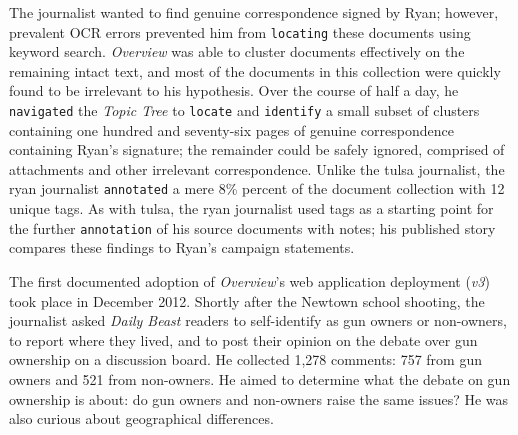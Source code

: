 The journalist wanted to find genuine correspondence signed by Ryan; however, prevalent \ac{OCR} errors prevented him from {\tt locating} these documents using keyword search. 
{\it Overview} was able to cluster documents effectively on the remaining intact text, and most of the documents in this collection were quickly found to be irrelevant to his hypothesis.
Over the course of half a day, he {\tt navigated} the {\it Topic Tree} to {\tt locate} and {\tt identify} a small subset of clusters containing one hundred and seventy-six pages of genuine correspondence containing Ryan's signature; the remainder could be safely ignored, comprised of attachments and other irrelevant correspondence.
Unlike the {\sc tulsa} journalist, the {\sc ryan} journalist {\tt annotated} a mere 8\% percent of the document collection with 12 unique tags.
As with {\sc tulsa}, the {\sc ryan} journalist used tags as a starting point for the further {\tt annotation} of his source documents with notes; his published story~\cite{Gillum2012} compares these findings to Ryan's campaign statements.

The first documented adoption of {\it Overview}'s web application deployment ({\it v3}) took place in December 2012.
Shortly after the Newtown school shooting, the journalist asked {\it Daily Beast} readers to self-identify as gun owners or non-owners, to report where they lived, and to post their opinion on the debate over gun ownership on a discussion board. 
He collected 1,278 comments: 757 from gun owners and 521 from non-owners.
He aimed to determine what the debate on gun ownership is about: do gun owners and non-owners raise the same issues? 
He was also curious about geographical differences.

